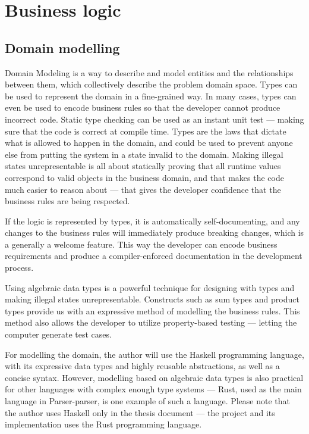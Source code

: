 \documentclass[english,bachelors,forcepolishlogotype]{wizthesis}
\newcommand{\paraphrase}[1]{#1}
\newcommand{\thisproject}{Parser-parser}
\begin{document}
\section{Business logic} \label{sec:business-logic}

\subsection{Domain modelling} \label{sbs:domain-modelling}

\paraphrase{Domain Modeling is a way to describe and model entities and the
relationships between them, which collectively describe the problem domain
space. Types can be used to represent the domain in a fine-grained way. In many
cases, types can even be used to encode business rules so that the developer
cannot produce incorrect code. Static type checking can be used as an instant
unit test --- making sure that the code is correct at compile time. Types are
the laws that dictate what is allowed to happen in the domain, and could be used
to prevent anyone else from putting the system in a state invalid to the domain.
Making illegal states unrepresentable is all about statically proving that all
runtime values correspond to valid objects in the business domain, and that
makes the code much easier to reason about --- that gives the developer
confidence that the business rules are being respected.}

\paraphrase{If the logic is represented by types, it is automatically
self-documenting, and any changes to the business rules will immediately produce
breaking changes, which is a generally a welcome feature. This way the developer
can encode business requirements and produce a compiler-enforced documentation in
the development process.}

Using algebraic data types is a powerful technique for designing with types and
making illegal states unrepresentable. Constructs such as sum types and product
types provide us with an expressive method of modelling the business rules.
This method also allows the developer to utilize property-based testing ---
letting the computer generate test cases.

For modelling the domain, the author will use the Haskell \cite{haskell}
programming language, with its expressive data types and highly reusable
abstractions, as well as a concise syntax. However, modelling based on algebraic
data types is also practical for other languages with complex enough type
systems --- Rust, used as the main language in \thisproject{}, is one example of
such a language. Please note that the author uses Haskell only in the thesis
document --- the project and its implementation uses the Rust programming
language.
\end{document}

